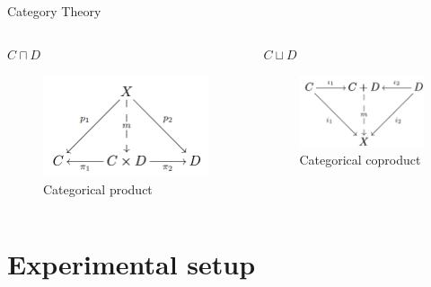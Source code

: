 \documentclass[bigger]{beamer}
\begin{document}
\begin{frame}[label={sec:org10f9ca8}]{Category Theory}
\begin{columns}
\begin{column}{0.5\columnwidth}
\centering
\(C \sqcap D\)

\begin{figure}[htbp]
\centering
\includegraphics[width=.9\linewidth]{imgs/product.png}
\caption{\label{fig:org7a558ef}Categorical product}
\end{figure}
\end{column}

\begin{column}{0.5\columnwidth}
\centering
\(C \sqcup D\)
\begin{figure}[htbp]
\centering
\includegraphics[width=.9\linewidth]{imgs/coproduct.png}
\caption{\label{fig:orgf585a4a}Categorical coproduct}
\end{figure}
\end{column}
\end{columns}
\end{frame}

\section{Experimental setup}
\label{sec:org7b598a4}
\end{document}
